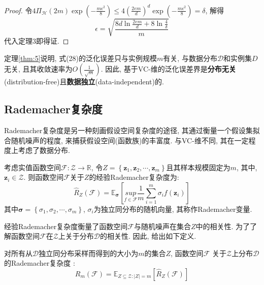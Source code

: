\begin{proof}
令$4\Pi _{\mathcal{H}}\left( 2m \right) \exp \left( -\frac{m\epsilon ^2}{8} \right) \le 4\left( \frac{2em}{d} \right) ^d\exp \left( -\frac{m\epsilon ^2}{8} \right) =\delta$, 解得
\begin{equation}
\epsilon =\sqrt{\frac{8d\ln \frac{2em}{d}+8\ln \frac{4}{\delta}}{m}}
\end{equation}
代入定理3即得证.
\end{proof}

定理\ref{thm:5}说明, 式(28)的泛化误差只与实例规模$m$有关, 与数据分布$\mathcal{D}$和实例集$D$无关, 且其收敛速率为$O\left( \frac{1}{\sqrt{m}} \right)$. 因此, 基于VC-维的泛化误差界是\textbf{分布无关}(distribution-free)且\textbf{数据独立}(data-independent)的.

\subsection{Rademacher复杂度}
Rademacher复杂度是另一种刻画假设空间复杂度的途径, 其通过衡量一个假设集拟合随机噪声的程度, 来捕获假设空间(函数族)的丰富度. 与VC-维不同, 其在一定程度上考虑了数据分布. 

\begin{definition}\label{def:6}
考虑实值函数空间$\mathcal{F}:\mathcal{Z}\rightarrow \mathbb{R}$, 令$Z = \left\{\boldsymbol{z}_1,\boldsymbol{z}_2,\cdots,\boldsymbol{z}_m\right\}$且其样本规模固定为$m$, 其中, $\boldsymbol{z}_i \in \mathcal{Z}$. 则函数空间$\mathcal{F}$关于$Z$的经验Rademacher复杂度为:
\begin{equation}
\hat{R}_Z\left( \mathcal{F} \right) =\mathbb{E}_{\boldsymbol{\sigma }}\left[ \underset{f\in \mathcal{F}}{sup}\frac{1}{m}\sum_{i=1}^m{\sigma _if\left( \boldsymbol{z}_i \right)} \right]
\end{equation}
其中$\boldsymbol{\sigma }=\left\{\sigma_1,\sigma_2,\cdots,\sigma_m\right\}$, $\sigma_i$为独立同分布的随机向量, 其称作Rademacher变量. 
\end{definition}

经验Rademacher复杂度衡量了函数空间$\mathcal{F}$与随机噪声在集合$Z$中的相关性. 为了了解函数空间$\mathcal{F}$在$\mathcal{Z}$上关于分布$\mathcal{D}$的相关性. 因此, 给出如下定义. 

\begin{definition}\label{def:7}
对所有从$\mathcal{D}$独立同分布采样而得到的大小为$m$的集合$Z$, 函数空间$\mathcal{F}$ 关于$\mathcal{Z}$上分布$\mathcal{D}$的Rademacher复杂度 :
\begin{equation}
R_m\left( \mathcal{F} \right) =\mathbb{E}_{Z\subseteq \mathcal{Z}:\left| Z \right|=m}\left[ \hat{R}_Z\left( \mathcal{F} \right) \right]
\end{equation}
\end{definition}

